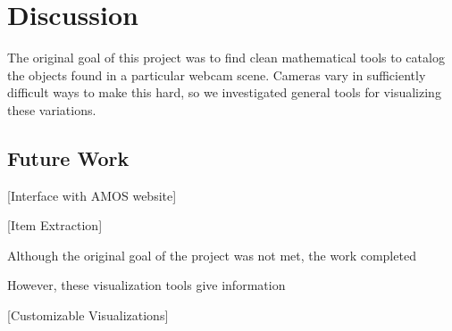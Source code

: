 \chapter{Discussion}
\label{cpt:discussion}

The original goal of this project was to find clean mathematical tools to catalog the objects found in a particular webcam scene.  Cameras vary in sufficiently difficult ways to make this hard, so we investigated general tools for visualizing these variations.

\section{Future Work}

[Interface with AMOS website]

[Item Extraction]

Although the original goal of the project was not met, the work completed

However, these visualization tools give information 

[Customizable Visualizations]




